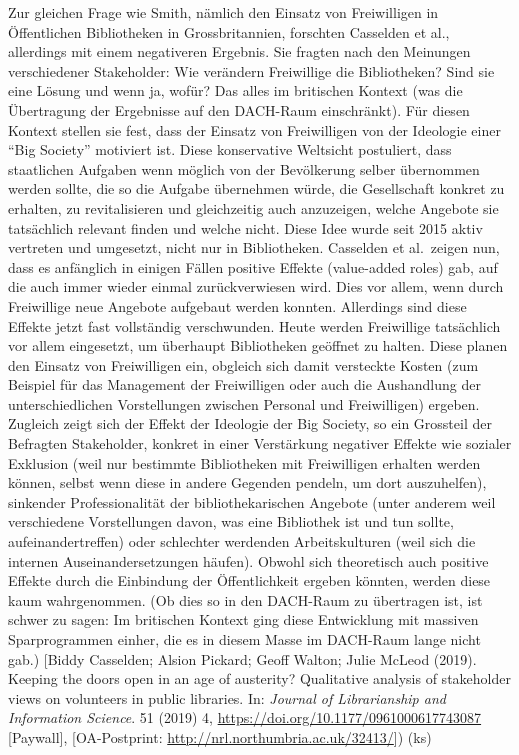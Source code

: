 \documentclass[a4paper,
fontsize=11pt,
oneside,
numbers=noperiodatend,
parskip=half-,
bibliography=totoc,
final
]{scrartcl}
\begin{document}
Zur gleichen Frage wie Smith, nämlich den Einsatz von Freiwilligen in
Öffentlichen Bibliotheken in Grossbritannien, forschten Casselden et
al., allerdings mit einem negativeren Ergebnis. Sie fragten nach den
Meinungen verschiedener Stakeholder: Wie verändern Freiwillige die
Bibliotheken? Sind sie eine Lösung und wenn ja, wofür? Das alles im
britischen Kontext (was die Übertragung der Ergebnisse auf den DACH-Raum
einschränkt). Für diesen Kontext stellen sie fest, dass der Einsatz von
Freiwilligen von der Ideologie einer \enquote{Big Society} motiviert
ist. Diese konservative Weltsicht postuliert, dass staatlichen Aufgaben
wenn möglich von der Bevölkerung selber übernommen werden sollte, die so
die Aufgabe übernehmen würde, die Gesellschaft konkret zu erhalten, zu
revitalisieren und gleichzeitig auch anzuzeigen, welche Angebote sie
tatsächlich relevant finden und welche nicht. Diese Idee wurde seit 2015
aktiv vertreten und umgesetzt, nicht nur in Bibliotheken. Casselden et
al.~zeigen nun, dass es anfänglich in einigen Fällen positive Effekte
(value-added roles) gab, auf die auch immer wieder einmal
zurückverwiesen wird. Dies vor allem, wenn durch Freiwillige neue
Angebote aufgebaut werden konnten. Allerdings sind diese Effekte jetzt
fast vollständig verschwunden. Heute werden Freiwillige tatsächlich vor
allem eingesetzt, um überhaupt Bibliotheken geöffnet zu halten. Diese
planen den Einsatz von Freiwilligen ein, obgleich sich damit versteckte
Kosten (zum Beispiel für das Management der Freiwilligen oder auch die
Aushandlung der unterschiedlichen Vorstellungen zwischen Personal und
Freiwilligen) ergeben. Zugleich zeigt sich der Effekt der Ideologie der
Big Society, so ein Grossteil der Befragten Stakeholder, konkret in
einer Verstärkung negativer Effekte wie sozialer Exklusion (weil nur
bestimmte Bibliotheken mit Freiwilligen erhalten werden können, selbst
wenn diese in andere Gegenden pendeln, um dort auszuhelfen), sinkender
Professionalität der bibliothekarischen Angebote (unter anderem weil
verschiedene Vorstellungen davon, was eine Bibliothek ist und tun
sollte, aufeinandertreffen) oder schlechter werdenden Arbeitskulturen
(weil sich die internen Auseinandersetzungen häufen). Obwohl sich
theoretisch auch positive Effekte durch die Einbindung der
Öffentlichkeit ergeben könnten, werden diese kaum wahrgenommen. (Ob dies
so in den DACH-Raum zu übertragen ist, ist schwer zu sagen: Im
britischen Kontext ging diese Entwicklung mit massiven Sparprogrammen
einher, die es in diesem Masse im DACH-Raum lange nicht gab.) {[}Biddy
Casselden; Alsion Pickard; Geoff Walton; Julie McLeod (2019). Keeping
the doors open in an age of austerity? Qualitative analysis of
stakeholder views on volunteers in public libraries. In: \emph{Journal
of Librarianship and Information Science}. 51 (2019) 4,
\url{https://doi.org/10.1177/0961000617743087} {[}Paywall{]},
{[}OA-Postprint: \url{http://nrl.northumbria.ac.uk/32413/}{]}) (ks)
\end{document}
